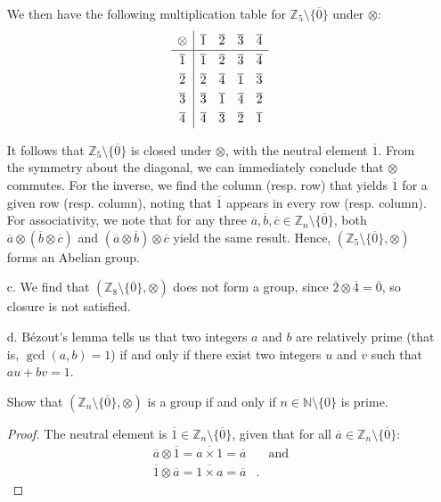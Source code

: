 \documentclass[11pt]{article}
\newcommand{\Z}{\mathbb{Z}}
\newcommand{\N}{\mathbb{N}}
\newcommand{\cls}[1]{\overline{#1}}                      %
\theoremstyle{definition}
\theoremstyle{plain}
\theoremstyle{remark}
\begin{document}
\begin{enumerate}
          We then have the following multiplication table for \(\Z_5 \setminus \{\cls{0}\}\) under \(\otimes\):
          \[
              \begingroup
              \renewcommand{\arraystretch}{1.3}
              \begin{array}{c|ccccc}
                  \otimes & \cls{1} & \cls{2} & \cls{3} & \cls{4} \\
                  \hline
                  \cls{1} & \cls{1} & \cls{2} & \cls{3} & \cls{4} \\
                  \cls{2} & \cls{2} & \cls{4} & \cls{1} & \cls{3} \\
                  \cls{3} & \cls{3} & \cls{1} & \cls{4} & \cls{2} \\
                  \cls{4} & \cls{4} & \cls{3} & \cls{2} & \cls{1} \\
              \end{array}
              \endgroup
          \]

          It follows that \(\Z_5 \setminus \{\cls{0}\}\) is closed under \(\otimes\), with the neutral element
          \(\cls{1}\). From the symmetry about the diagonal, we can immediately conclude that \(\otimes\) commutes.  For
          the inverse, we find the column (resp. row) that yields \(\cls{1}\) for a given row (resp. column), noting
          that \(\cls{1}\) appears in every row (resp. column).  For associativity, we note that for any three
          \(\cls{a}, \cls{b}, \cls{c} \in \Z_n \setminus \{\cls{0}\}\), both \(\cls{a} \otimes (\cls{b} \otimes
          \cls{c})\) and \((\cls{a} \otimes \cls{b}) \otimes \cls{c}\) yield the same result.  Hence, \((\Z_5 \setminus
          \{\cls{0}\}, \otimes)\) forms an Abelian group.

    \item[c.] We find that \((\Z_8 \setminus \{\cls{0}\}, \otimes)\) does not form a group, since \( \cls{2} \otimes
          \cls{4} = \cls{0} \), so closure is not satisfied.

    \item[d.] Bézout's lemma tells us that two integers \(a\) and \(b\) are relatively prime (that is, \(\gcd(a, b) = 1\)) if
          and only if there exist two integers \(u\) and \(v\) such that \(au + bv = 1\).

          Show that \((\Z_n \setminus \{\cls{0}\}, \otimes)\) is a group if and only if \(n \in \N \setminus \{0\}\) is
          prime.

          \begin{proof}[Proof]
              The neutral element is \(\cls{1} \in \Z_n \setminus \{\cls{0}\}\), given that for all \(\cls{a} \in \Z_n
              \setminus \{\cls{0}\}\):
              \[
                  \begin{aligned}
                      \cls{a} \otimes \cls{1} = \cls{a \times 1} = \cls{a} & \quad \textrm{and} \\
                      \cls{1} \otimes \cls{a} = \cls{1 \times a} = \cls{a} & .
                  \end{aligned}
              \]


\end{proof}
\end{enumerate}
\end{document}
